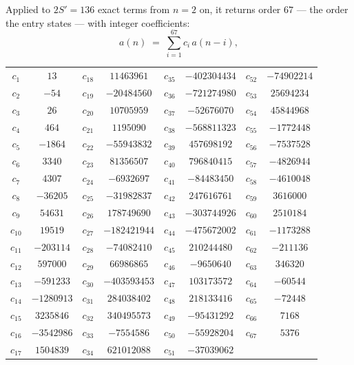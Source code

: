 \documentclass[11pt,a4paper]{article}
\theoremstyle{plain}
\theoremstyle{definition}
\begin{document}
Applied to $2S'=136$ exact terms from $n=2$ on, it returns order $67$ --- the
order the entry states --- with integer coefficients:
\[
a(n)\;=\;\sum_{i=1}^{67}c_i\,a(n-i),
\]
\begin{center}\small
\begin{tabular}{cccccccc}
$c_{1}$ & $13$ & $c_{18}$ & $11463961$ & $c_{35}$ & $-402304434$ & $c_{52}$ & $-74902214$ \\
$c_{2}$ & $-54$ & $c_{19}$ & $-20484560$ & $c_{36}$ & $-721274980$ & $c_{53}$ & $25694234$ \\
$c_{3}$ & $26$ & $c_{20}$ & $10705959$ & $c_{37}$ & $-52676070$ & $c_{54}$ & $45844968$ \\
$c_{4}$ & $464$ & $c_{21}$ & $1195090$ & $c_{38}$ & $-568811323$ & $c_{55}$ & $-1772448$ \\
$c_{5}$ & $-1864$ & $c_{22}$ & $-55943832$ & $c_{39}$ & $457698192$ & $c_{56}$ & $-7537528$ \\
$c_{6}$ & $3340$ & $c_{23}$ & $81356507$ & $c_{40}$ & $796840415$ & $c_{57}$ & $-4826944$ \\
$c_{7}$ & $4307$ & $c_{24}$ & $-6932697$ & $c_{41}$ & $-84483450$ & $c_{58}$ & $-4610048$ \\
$c_{8}$ & $-36205$ & $c_{25}$ & $-31982837$ & $c_{42}$ & $247616761$ & $c_{59}$ & $3616000$ \\
$c_{9}$ & $54631$ & $c_{26}$ & $178749690$ & $c_{43}$ & $-303744926$ & $c_{60}$ & $2510184$ \\
$c_{10}$ & $19519$ & $c_{27}$ & $-182421944$ & $c_{44}$ & $-475672002$ & $c_{61}$ & $-1173288$ \\
$c_{11}$ & $-203114$ & $c_{28}$ & $-74082410$ & $c_{45}$ & $210244480$ & $c_{62}$ & $-211136$ \\
$c_{12}$ & $597000$ & $c_{29}$ & $66986865$ & $c_{46}$ & $-9650640$ & $c_{63}$ & $346320$ \\
$c_{13}$ & $-591233$ & $c_{30}$ & $-403593453$ & $c_{47}$ & $103173572$ & $c_{64}$ & $-60544$ \\
$c_{14}$ & $-1280913$ & $c_{31}$ & $284038402$ & $c_{48}$ & $218133416$ & $c_{65}$ & $-72448$ \\
$c_{15}$ & $3235846$ & $c_{32}$ & $340495573$ & $c_{49}$ & $-95431292$ & $c_{66}$ & $7168$ \\
$c_{16}$ & $-3542986$ & $c_{33}$ & $-7554586$ & $c_{50}$ & $-55928204$ & $c_{67}$ & $5376$ \\
$c_{17}$ & $1504839$ & $c_{34}$ & $621012088$ & $c_{51}$ & $-37039062$ &  &  \\
\end{tabular}
\end{center}
\end{document}
